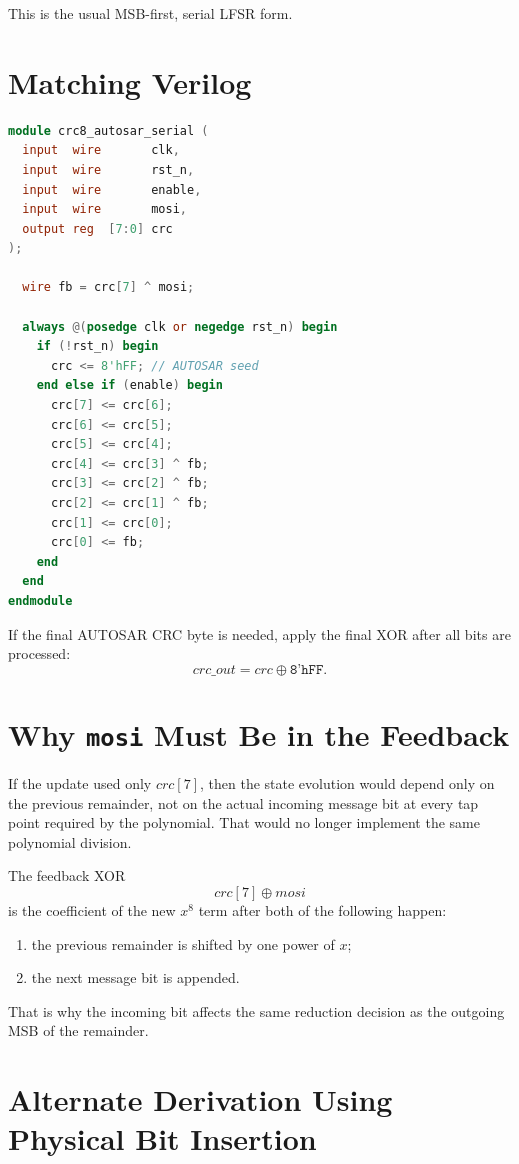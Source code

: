 \documentclass[11pt]{article}
\begin{document}
This is the usual MSB-first, serial LFSR form.

\section{Matching Verilog}

\begin{lstlisting}[language=Verilog]
module crc8_autosar_serial (
  input  wire       clk,
  input  wire       rst_n,
  input  wire       enable,
  input  wire       mosi,
  output reg  [7:0] crc
);

  wire fb = crc[7] ^ mosi;

  always @(posedge clk or negedge rst_n) begin
    if (!rst_n) begin
      crc <= 8'hFF; // AUTOSAR seed
    end else if (enable) begin
      crc[7] <= crc[6];
      crc[6] <= crc[5];
      crc[5] <= crc[4];
      crc[4] <= crc[3] ^ fb;
      crc[3] <= crc[2] ^ fb;
      crc[2] <= crc[1] ^ fb;
      crc[1] <= crc[0];
      crc[0] <= fb;
    end
  end
endmodule
\end{lstlisting}

If the final AUTOSAR CRC byte is needed, apply the final XOR after all bits are
processed:
\[
\mathit{crc\_out} = \mathit{crc} \oplus \texttt{8'hFF}.
\]

\section{Why \texttt{mosi} Must Be in the Feedback}

If the update used only $\mathit{crc}[7]$, then the state evolution would depend
only on the previous remainder, not on the actual incoming message bit at every
tap point required by the polynomial. That would no longer implement the same
polynomial division.

The feedback XOR
\[
\mathit{crc}[7] \oplus \mathit{mosi}
\]
is the coefficient of the new $x^8$ term after both of the following happen:
\begin{enumerate}
\item the previous remainder is shifted by one power of $x$;
\item the next message bit is appended.
\end{enumerate}

That is why the incoming bit affects the same reduction decision as the outgoing
MSB of the remainder.

\section{Alternate Derivation Using Physical Bit Insertion}
\end{document}
